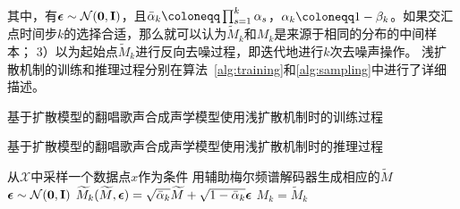 其中，有${\boldsymbol{\epsilon}}\sim\mathcal{N}(\mathbf{0}, \mathbf{I})$，且$\bar\alpha_k \defeq \prod_{s=1}^k \alpha_s$，$\alpha_k \defeq 1-\beta_k$。如果交汇点时间步$k$的选择合适，那么就可以认为$\widetilde{M}_k$和$M_k$是来源于相同的分布的中间样本；
3）以为起始点$\widetilde{M}_k$进行反向去噪过程，即迭代地进行$k$次去噪声操作。
浅扩散机制的训练和推理过程分别在算法~\ref{alg:training}和\ref{alg:sampling}中进行了详细描述。
\begin{algorithm}[!ht]
\caption{基于扩散模型的翻唱歌声合成声学模型使用浅扩散机制时的训练过程}
\label{alg:training}
\end{algorithm}
\begin{algorithm}[!h]
\caption{基于扩散模型的翻唱歌声合成声学模型使用浅扩散机制时的推理过程}
\label{alg:sampling}
    从$\mathcal{X}$中采样一个数据点$x$作为条件\;
    用辅助梅尔频谱解码器生成相应的$\widetilde{M}$\;
    ${\boldsymbol{\epsilon}}\sim\mathcal{N}(\mathbf{0},\mathbf{I})$\;
    $\widetilde{M}_k(\widetilde{M}, {\boldsymbol{\epsilon}}) = \sqrt{\bar\alpha_k}\widetilde{M} + \sqrt{1-\bar\alpha_k}{\boldsymbol{\epsilon}}$\;
    $M_k =  \widetilde{M}_k$\;
\end{algorithm}
